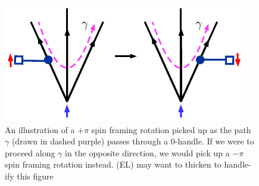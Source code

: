 \documentclass[12pt,a4paper]{article}
\newcommand{\cc}{\mathbb{C}}
\newcommand{\kw}[1]{{\color{kwcolor}\footnotesize{(KW) #1}}}
\newcommand{\ethan}[1]{{\color{amethyst}\footnotesize{(EL) #1}}}
\begin{document}

\medskip

\begin{figure}
\begin{center}
\includegraphics{spin_rot_through_0handle.pdf}
\caption{ \label{spin_rot_through_0handle} An illustration of a $+\pi$ spin framing rotation picked up as the path $\gamma$ (drawn in dashed purple) passes through a 0-handle. 
If we were to proceed along $\gamma$ in the opposite direction, we would pick up a $-\pi$ spin framing rotation instead. \ethan{may want to thicken to handle-ify this figure}
  }
\end{center}
\end{figure}
\end{document}
